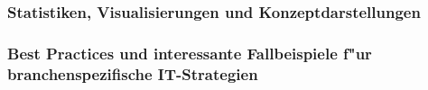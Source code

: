 \documentclass[a4paper, 12pt]{article} %
\begin{document}
\subsubsection{Statistiken, Visualisierungen und Konzeptdarstellungen}


\subsubsection{Best Practices und interessante Fallbeispiele f"ur branchenspezifische IT-Strategien}






\end{document}
